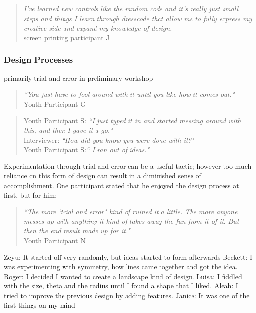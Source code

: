 \documentclass{sigchi}
\begin{document}
\begin{quotation}
	\textit{I've learned new controls like the random code and it's really just small steps and things I learn through dresscode that allow me to fully express my creative side and expand my knowledge of design.}
	\\screen printing participant J
\end{quotation}

\subsubsection{Design Processes}

primarily trial and error in preliminary workshop
\begin{quotation}
\textit{``You just have to fool around with it until you like how it comes out."}
\\Youth Participant G
\end{quotation}

\begin{quotation}
Youth Participant S: \textit{``I just typed it in and started messing around with this, and then I gave it a go."}
\\Interviewer: \textit{``How did you know you were done with it?"}
\\Youth Participant S:\textit{`` I ran out of ideas."} 
\end{quotation}

Experimentation through trial and error can be a useful tactic; however too much reliance on this form of design can result in a diminished sense of accomplishment. One participant stated that he enjoyed the design process at first, but for him:

	 \begin{quotation}
	  \textit{``The more `trial and error" kind of ruined it a little. The more anyone messes up with anything it kind of takes away the fun from it of it. But then the end result made up for it."} \\Youth Participant N
	 \end{quotation}

Zeyu: It started off very randomly, but ideas started to form afterwards
Beckett: I was experimenting with symmetry, how lines came together and got the idea.
Roger: I decided I wanted to create a landscape kind of design.
Luisa: I fiddled with the size, theta and the radius until I found a shape that I liked.
Aleah: I tried to improve the previous design by adding features.
Janice: It was one of the first things on my mind
\end{document}
